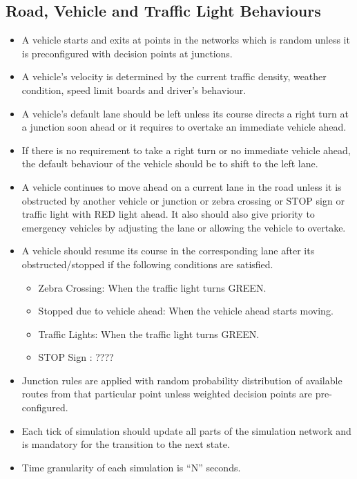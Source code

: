 \documentclass[11pt]{article}
\begin{document}
	\subsection{Road, Vehicle and Traffic Light Behaviours}
		\begin{itemize}
			\item A vehicle starts and exits at points in the networks which is random unless it is preconfigured with decision points at junctions.
			\item A vehicle’s velocity is determined by the current traffic density, weather condition, speed limit boards and driver’s behaviour.
			\item A vehicle’s default lane should be left unless its course directs a right turn at a junction soon ahead or it requires to overtake an immediate vehicle ahead.
			\item If there is no requirement to take a right turn or no immediate vehicle ahead, the default behaviour of the vehicle should be to shift to the left lane.
			\item A vehicle continues to move ahead on a current lane in the road unless it is obstructed by another vehicle or junction or zebra crossing or STOP sign or traffic light with RED light ahead. It also should also give priority to emergency vehicles by adjusting the lane or allowing the vehicle to overtake.
			\item A vehicle should resume its course in the corresponding lane after its obstructed/stopped if the following conditions are satisfied.
				\begin{itemize}
					\item Zebra Crossing: When the traffic light turns GREEN.
					\item Stopped due to vehicle ahead: When the vehicle ahead starts moving.
					\item Traffic Lights:  When the traffic light turns GREEN.
					\item STOP Sign : ????
				\end{itemize}
			\item Junction rules are applied with random probability distribution of available routes from that particular point unless weighted decision points are pre-configured.
			\item Each tick of simulation should update all parts of the simulation network and is mandatory for the transition to the next state.
			\item Time granularity of each simulation is “N” seconds.
	\end{itemize}	
\end{document}
